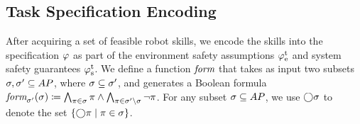 \documentclass[letterpaper, 10 pt, conference]{ieeeconf}
\begin{document}
\subsection{Task Specification Encoding}\label{sec:spec_gen}

After acquiring a set of feasible robot skills, 
we encode the skills into the specification $\varphi$ 
as part of the environment safety assumptions $\varphi_\textrm{e}^\textrm{t}$ 
and system safety guarantees $\varphi_\textrm{s}^\textrm{t}$.
%
%
We define a function $\textit{form}$ that takes as input
two subsets $\sigma, \sigma' \subseteq AP$,
where $\sigma \subseteq \sigma'$,
and generates a Boolean formula
$\textit{form}_{\sigma'}(\sigma) \coloneqq \bigwedge_{\pi\in\sigma}\pi \land \bigwedge_{\pi \in \sigma'\setminus\sigma} \neg\pi$.
For any subset $\sigma \subseteq AP$,
we use $\bigcirc\sigma$ to denote the set $\{\bigcirc \pi \mid \pi \in \sigma\}$.




\end{document}
